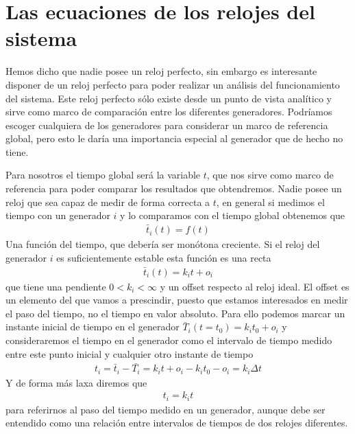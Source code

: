 \documentclass{tufte-handout}
\begin{document}
\section{Las ecuaciones de los relojes del sistema}
Hemos dicho que nadie posee un reloj perfecto, sin embargo es interesante disponer de un reloj perfecto para poder realizar un análisis del funcionamiento del sistema. Este reloj perfecto sólo existe desde un punto de vista analítico y sirve como marco de comparación entre los diferentes generadores. Podríamos escoger cualquiera de los generadores para considerar un marco de referencia global, pero esto le daría una importancia especial al generador que de hecho no tiene.

Para nosotros el tiempo global será la variable $t$, que nos sirve como marco de referencia para poder comparar los resultados que obtendremos. Nadie posee un reloj que sea capaz de medir de forma correcta a $t$, en general si medimos el tiempo con un generador $i$ y lo comparamos con el tiempo global obtenemos que 
\begin{align}
    \bar{t}_i(t)=f(t)
\end{align}
Una función del tiempo, que debería ser monótona creciente. Si el reloj del generador $i$ es suficientemente estable esta función es una recta
\begin{align}
    \bar{t}_i(t)=k_it+o_i
\end{align}
que tiene una pendiente $0<k_i<\infty$ y un offset respecto al reloj ideal. El offset es un elemento del que vamos a prescindir, puesto que estamos interesados en medir el paso del tiempo, no el tiempo en valor absoluto. Para ello podemos marcar un instante inicial de tiempo en el generador $\bar{T}_i(t=t_0)=k_it_0+o_i$ y consideraremos el tiempo en el generador como el intervalo de tiempo medido entre este punto inicial y cualquier otro instante de tiempo 
\begin{align}
    t_i=\bar{t}_i-\bar{T_i}=k_it+o_i-k_it_0-o_i=k_i\Delta t
\end{align}
Y de forma más laxa diremos que 
\begin{align}
t_i=k_it
\end{align}
para referirnos al paso del tiempo medido en un generador, aunque debe ser entendido como una relación entre intervalos de tiempos de dos relojes diferentes.
\end{document}
